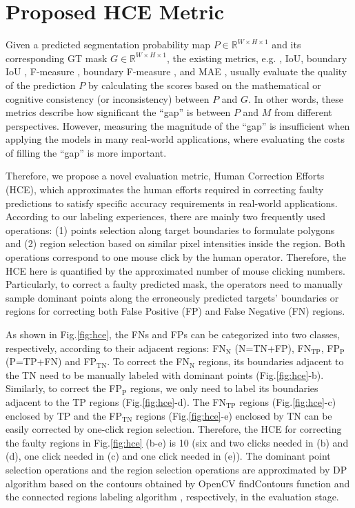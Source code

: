 \section{Proposed HCE Metric}\label{sec:HCE}

Given a predicted segmentation probability map $P \in \mathbb{R}^{W \times H \times 1}$ and its corresponding GT mask $G \in \mathbb{R}^{W \times H \times 1}$, the existing metrics, e.g. , IoU, boundary IoU \cite{DBLP:conf/cvpr/ChengGDBK21}, F-measure \cite{achanta2009frequency}, boundary F-measure \cite{ehrig2005relaxed,qin2019basnet}, and MAE \cite{perazzi2012saliency}, usually evaluate the quality of the prediction $P$ by calculating the scores based on the mathematical or cognitive consistency (or inconsistency) between $P$ and $G$. In other words, these metrics describe how significant the ``gap'' is between $P$ and $M$ from different perspectives. However, measuring the magnitude of the ``gap'' is insufficient when applying the models in many real-world applications, where evaluating the costs of filling the ``gap'' is more important.

Therefore, we propose a novel evaluation metric, Human Correction Efforts (HCE), which approximates the human efforts required in correcting faulty predictions to satisfy specific accuracy requirements in real-world applications. According to our labeling experiences, there are mainly two frequently used operations: (1) points selection along target boundaries to formulate polygons and (2) region selection based on similar pixel intensities inside the region. Both operations correspond to one mouse click by the human operator. Therefore, the HCE here is quantified by the approximated number of mouse clicking numbers. Particularly, to correct a faulty predicted mask, the operators need to manually sample dominant points along the erroneously predicted targets' boundaries or regions for correcting both False Positive (FP) and False Negative (FN) regions. 

As shown in Fig.\ref{fig:hce}, the FNs and FPs can be categorized into two classes, respectively, according to their adjacent regions: FN$_{\text{N}}$ (N=TN+FP), FN$_{\text{TP}}$, FP$_{\text{P}}$ (P=TP+FN) and FP$_{\text{TN}}$. 
To correct the FN$_{\text{N}}$ regions, its boundaries adjacent to the TN need to be manually labeled with dominant points (Fig.\ref{fig:hce}-b). Similarly, to correct the FP$_{\text{P}}$ regions, we only need to label its boundaries adjacent to the TP regions (Fig.\ref{fig:hce}-d). The FN$_{\text{TP}}$ regions (Fig.\ref{fig:hce}-c) enclosed by TP and the FP$_{\text{TN}}$ regions (Fig.\ref{fig:hce}-e) enclosed by TN can be easily corrected by one-click region selection. Therefore, the HCE for correcting the faulty regions in Fig.\ref{fig:hce} (b-e) is 10 (six and two clicks needed in (b) and (d), one click needed in (c) and one click needed in (e)). The dominant point selection operations and the region selection operations are approximated by DP algorithm \cite{DBLP:journals/cvgip/Ramer72} based on the contours obtained by OpenCV findContours \cite{DBLP:journals/cvgip/SuzukiA85} function and the connected regions labeling algorithm \cite{DBLP:journals/tcs/FiorioG96,DBLP:conf/miip/WuOS05}, respectively, in the evaluation stage.

